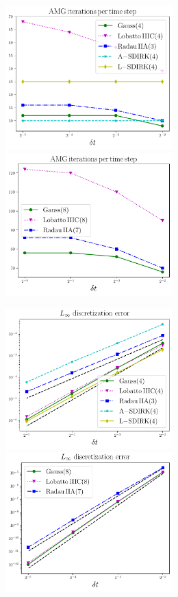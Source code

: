 \documentclass[review]{siamart}
\begin{document}
\begin{figure}[H]
\centerline{
\includegraphics[width = 0.575\textwidth]{figures/amg_iters_14_34_23_-14_4_d2_ex1.pdf}
\quad
\includegraphics[width = 0.575\textwidth]{figures/amg_iters_18_38_27_d2_ex1.pdf}
}
\centerline{
\includegraphics[width = 0.575\textwidth]{figures/errors_iters_14_34_23_-14_4_d2_ex1.pdf}
\quad
\includegraphics[width = 0.575\textwidth]{figures/errors_iters_18_38_27_d2_ex1.pdf}
}
\end{figure}
\end{document}
